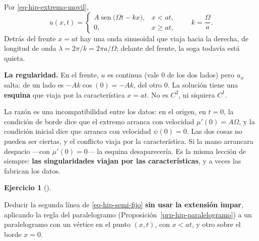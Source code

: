 \documentclass[
  spanish,
  a4paper,
]{scrbook}
\theoremstyle{definition}
\theoremstyle{plain}
\theoremstyle{definition}
\theoremstyle{plain}
\theoremstyle{definition}
\newtheorem{exercise}{Ejercicio}[chapter]
\theoremstyle{remark}
\begin{document}
\begin{tcolorbox}[enhanced jigsaw, arc=.35mm, bottomrule=.15mm, bottomtitle=1mm, breakable, colback=white, colbacktitle=quarto-callout-tip-color!10!white, colframe=quarto-callout-tip-color-frame, coltitle=black, left=2mm, leftrule=.75mm, opacityback=0, opacitybacktitle=0.6, rightrule=.15mm, title=\textcolor{quarto-callout-tip-color}{\faLightbulb}\hspace{0.5em}{Solución}, titlerule=0mm, toprule=.15mm, toptitle=1mm]

Por \ref{eq-hip-extremo-movil}, \[
u(x,t) = \begin{cases} A\operatorname{sen}\big(\Omega t - kx\big), & x<at,\\ 0, & x\ge at,\end{cases}
\qquad k = \frac{\Omega}{a}.
\] Detrás del frente \(x = at\) hay una onda sinusoidal que viaja hacia
la derecha, de longitud de onda \(\lambda = 2\pi/k = 2\pi a/\Omega\);
delante del frente, la soga todavía está quieta.

\textbf{La regularidad.} En el frente, \(u\) es continua (vale \(0\) de
los dos lados) pero \(u_x\) salta: de un lado es \(-Ak\cos(0) = -Ak\),
del otro \(0\). La solución tiene una \textbf{esquina} que viaja por la
característica \(x = at\). No es \(C^2\), ni siquiera \(C^1\).

La razón es una incompatibilidad entre los datos: en el origen, en
\(t=0\), la condición de borde dice que el extremo arranca con velocidad
\(\mu'(0) = A\Omega\), y la condición inicial dice que arranca con
velocidad \(\psi(0) = 0\). Las dos cosas no pueden ser ciertas, y el
conflicto viaja por la característica. Si la mano arrancara despacio
---con \(\mu'(0) = 0\)--- la esquina desaparecería. Es la misma lección
de siempre: \textbf{las singularidades viajan por las características},
y a veces las fabrican los datos.

\end{tcolorbox}

\begin{exercise}[]\protect\hypertarget{exr-hip-paralelogramo-borde}{}\label{exr-hip-paralelogramo-borde}

Deducir la segunda línea de \ref{eq-hip-semi-fijo} \textbf{sin usar la
extensión impar}, aplicando la regla del paralelogramo
(Proposición~\ref{prp-hip-paralelogramo}) a un paralelogramo con un
vértice en el punto \((x,t)\), con \(x<at\), y otro sobre el borde
\(x=0\).

\end{exercise}
\end{document}
